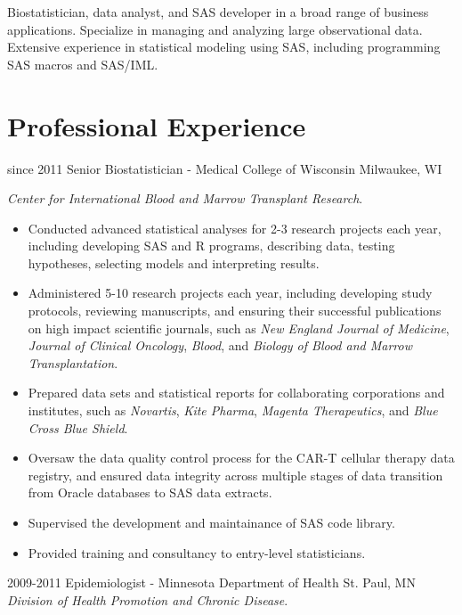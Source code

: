 Biostatistician, data analyst, and SAS developer in a broad range of business applications. Specialize in managing and analyzing large observational data. Extensive experience in statistical modeling using SAS, including programming SAS macros and SAS/IML.\\

\section{Professional Experience}

\begin{entrylist}
  \entry
    {since 2011}
    {Senior Biostatistician - Medical College of Wisconsin}
    {Milwaukee, WI}
    {
    \textit{Center for International Blood and Marrow Transplant Research}.
    \begin{itemize}
      \item Conducted advanced statistical analyses for 2-3 research projects each year, including developing SAS and R programs, describing data, testing hypotheses, selecting models and interpreting results.
      \item Administered 5-10 research projects each year, including developing study protocols, reviewing manuscripts, and ensuring their successful publications on high impact scientific journals, such as \textit{New England Journal of Medicine}, \textit{Journal of Clinical Oncology}, \textit{Blood}, and \textit{Biology of Blood and Marrow Transplantation}.
      \item Prepared data sets and statistical reports for collaborating corporations and institutes, such as \textit{Novartis}, \textit{Kite Pharma}, \textit{Magenta Therapeutics}, and \textit{Blue Cross Blue Shield}.
      \item Oversaw the data quality control process for the CAR-T cellular therapy data registry, and ensured data integrity across multiple stages of data transition from Oracle databases to SAS data extracts.
      \item Supervised the development and maintainance of SAS code library.
      \item Provided training and consultancy to entry-level statisticians.
    \end{itemize}
    }
  \entry
    {2009-2011}
    {Epidemiologist - Minnesota Department of Health}
    {St. Paul, MN}
    {
    \textit{Division of Health Promotion and Chronic Disease}.
}
\end{entrylist}
